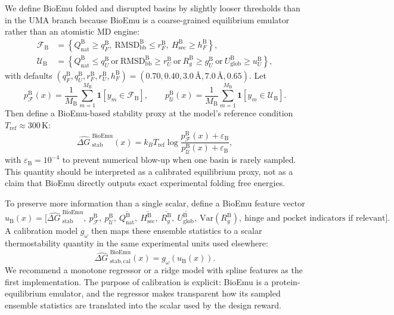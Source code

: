\documentclass[11pt]{article}
\newcommand{\angstrom}{\ensuremath{\text{\AA}}}
\newcommand{\dG}{\ensuremath{\Delta G \ }}
\begin{document}
	We define BioEmu folded and disrupted basins by slightly looser thresholds than in the UMA branch because BioEmu is a coarse-grained equilibrium emulator rather than an atomistic MD engine:
	\begin{align}
		\mathcal{F}_{\mathrm B} &= \left\{Q_{\mathrm{nat}}^{\mathrm B}\geq q_F^{\mathrm B},\ \mathrm{RMSD}_{\mathrm{bb}}^{\mathrm B}\leq r_F^{\mathrm B},\ H_{\mathrm{sec}}^{\mathrm B}\geq h_F^{\mathrm B}\right\},\\
		\mathcal{U}_{\mathrm B} &= \left\{Q_{\mathrm{nat}}^{\mathrm B}\leq q_U^{\mathrm B}\ \text{or}\ \mathrm{RMSD}_{\mathrm{bb}}^{\mathrm B}\geq r_U^{\mathrm B}\ \text{or}\ R_g^{\mathrm B}\geq g_U^{\mathrm B}\ \text{or}\ U_{\mathrm{glob}}^{\mathrm B}\geq u_U^{\mathrm B}\right\},
	\end{align}
	with defaults $(q_F^{\mathrm B},q_U^{\mathrm B},r_F^{\mathrm B},r_U^{\mathrm B},h_F^{\mathrm B})=(0.70,0.40,3.0\,\angstrom,7.0\,\angstrom,0.65)$. Let
	\[
	p_{\mathcal F}^{\mathrm B}(x)=\frac{1}{M_{\mathrm B}}\sum_{m=1}^{M_{\mathrm B}}\mathbf{1}[y_m\in\mathcal{F}_{\mathrm B}],\qquad
	p_{\mathcal U}^{\mathrm B}(x)=\frac{1}{M_{\mathrm B}}\sum_{m=1}^{M_{\mathrm B}}\mathbf{1}[y_m\in\mathcal{U}_{\mathrm B}].
	\]
	Then define a BioEmu-based stability proxy at the model's reference condition $T_{\mathrm{ref}}\approx 300\,\mathrm K$:
	\begin{equation}
		\label{eq:bioemu_twostate}
		\widehat{\dG}^{\mathrm{BioEmu}}_{\mathrm{stab}}(x)=k_B T_{\mathrm{ref}} \log \frac{p_{\mathcal F}^{\mathrm B}(x)+\varepsilon_{\mathrm B}}{p_{\mathcal U}^{\mathrm B}(x)+\varepsilon_{\mathrm B}},
	\end{equation}
	with $\varepsilon_{\mathrm B}=10^{-4}$ to prevent numerical blow-up when one basin is rarely sampled. This quantity should be interpreted as a calibrated equilibrium proxy, not as a claim that BioEmu directly outputs exact experimental folding free energies.
	
	To preserve more information than a single scalar, define a BioEmu feature vector
	\begin{equation}
		u_{\mathrm B}(x)=\Big[\widehat{\dG}^{\mathrm{BioEmu}}_{\mathrm{stab}},\ p_{\mathcal F}^{\mathrm B},\ p_{\mathcal U}^{\mathrm B},\ \overline{Q_{\mathrm{nat}}^{\mathrm B}},\ \overline{H_{\mathrm{sec}}^{\mathrm B}},\ \overline{R_g^{\mathrm B}},\ \overline{U_{\mathrm{glob}}^{\mathrm B}},\ \mathrm{Var}(R_g^{\mathrm B}),\ \text{hinge and pocket indicators if relevant}\Big].
	\end{equation}
	A calibration model $g_\omega$ then maps these ensemble statistics to a scalar thermostability quantity in the same experimental units used elsewhere:
	\begin{equation}
		\widehat{\dG}^{\mathrm{BioEmu}}_{\mathrm{stab,cal}}(x)=g_\omega\!\left(u_{\mathrm B}(x)\right).
	\end{equation}
	We recommend a monotone regressor or a ridge model with spline features as the first implementation. The purpose of calibration is explicit: BioEmu is a protein-equilibrium emulator, and the regressor makes transparent how its sampled ensemble statistics are translated into the scalar used by the design reward.
	
\end{document}
